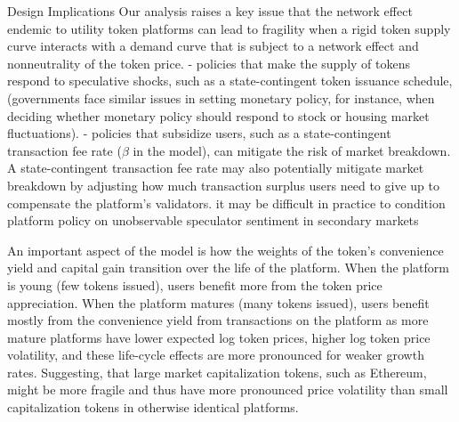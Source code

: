 Design Implications
Our analysis raises a key issue that the network effect endemic to utility token platforms can lead to fragility when a rigid token supply curve interacts with a demand curve that is subject to a network effect and nonneutrality of the token price.
  - policies that make the supply of tokens respond to speculative shocks, such as a state-contingent token issuance schedule, (governments face similar issues in setting monetary policy, for instance, when deciding whether monetary policy should respond to stock or housing market fluctuations).
  - policies that subsidize users, such as a state-contingent transaction fee rate ($\beta$ in the model), can mitigate the risk of market breakdown.  A state-contingent transaction fee rate may also potentially mitigate market breakdown by adjusting how much transaction surplus users need to give up to compensate the platform's validators. it may be difficult in practice to condition
platform policy on unobservable speculator sentiment in secondary markets

An important aspect of the model is how the weights of the token's convenience yield and capital gain transition over the life of the platform. When the platform is young (few tokens issued), users benefit more from the token price appreciation. When the platform matures (many tokens issued), users benefit mostly from the convenience yield from transactions on the platform as more mature platforms have lower expected log token prices, higher log token price volatility, and these life-cycle effects are more pronounced for weaker growth rates. Suggesting, that large market capitalization tokens, such as Ethereum, might be more fragile and thus have more pronounced price volatility than small capitalization tokens in otherwise identical platforms.